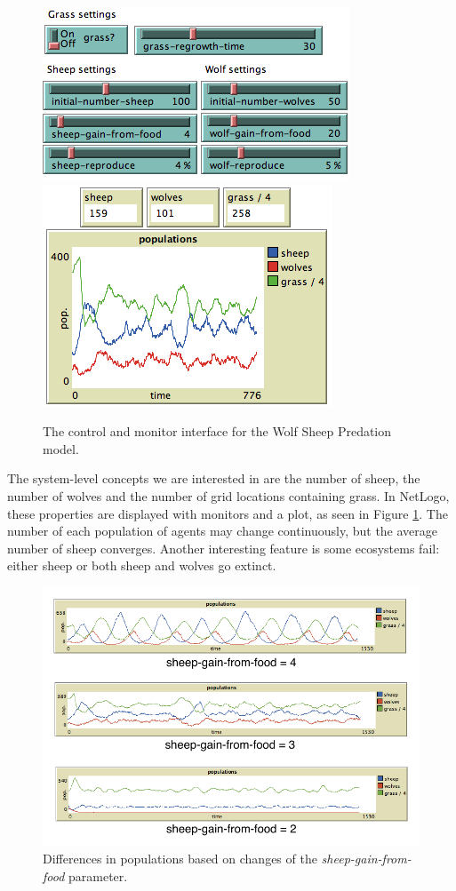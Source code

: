 \begin{figure}[ht]
\centering
\includegraphics[scale=.66667]{images/wolfsheepcontrols.png}
\includegraphics[scale=.66667]{images/wolfsheepmons.png}
\caption{The control and monitor interface for the Wolf Sheep Predation model.}
\label{fig:wolfsheepui}
\end{figure}

The system-level concepts we are interested in are the number of sheep, the number of wolves and the number of grid locations containing grass.
In NetLogo, these properties are displayed with monitors and a plot, as seen in Figure \ref{fig:wolfsheepui}.
The number of each population of agents may change continuously, but the average number of sheep converges.
Another interesting feature is some ecosystems fail: either sheep or both sheep and wolves go extinct.

\begin{figure}[ht]
\centering
\includegraphics[scale=1]{images/different_sheep.pdf}
\caption{Differences in populations based on changes of the \textit{sheep-gain-from-food} parameter.}
\label{fig:diffsheep}
\end{figure}

